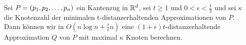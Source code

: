     \begin{theorem}
    	\label{theo:mvpstime}
    	Sei $P = (p_1, p_2, \mathellipsis, p_n)$ ein Kantenzug in $\mathbb{R}^d$, sei $t \geq 1$ und $0 < \epsilon < \frac{1}{3}$ und sei $\kappa$ die Knotenzahl der minimalen t-distanzerhaltenden Approximationen von $P$. Dann können wir in $O(n \log n + \frac{t}{\epsilon}n)$ eine $(1 + \epsilon)t$-distanzerhaltende Approximation $Q$ von $P$ mit maximal $\kappa$ Knoten berechnen.
    	
    \end{theorem}